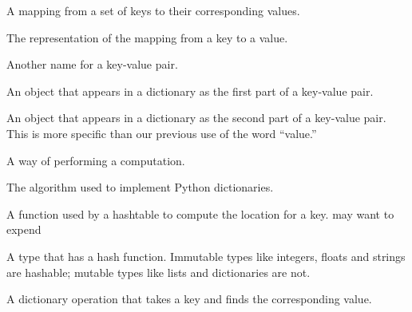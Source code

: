 \begin{vocabulary}[dictionary:] A mapping from a set of keys to their
corresponding values.
\end{vocabulary}
	
\begin{vocabulary} The representation of the mapping from
a key to a value.
\end{vocabulary}
	
\begin{vocabulary}[item:] Another name for a key-value pair.
\end{vocabulary}
	
\begin{vocabulary}[key:] An object that appears in a dictionary as the
first part of a key-value pair.
\end{vocabulary}
	
\begin{vocabulary}[value:] An object that appears in a dictionary as the
second part of a key-value pair.  This is more specific than
our previous use of the word ``value.''
\end{vocabulary}
	
\begin{vocabulary}[implementation:] A way of performing a computation.
\end{vocabulary}
	
\begin{vocabulary}[hashtable:] The algorithm used to implement Python
dictionaries.
\end{vocabulary}
	
\begin{vocabulary} A function used by a hashtable to compute the
location for a key.{\color{red} may want to expend}
\end{vocabulary}
	
\begin{vocabulary}[hashable:] A type that has a hash function.  Immutable
types like integers,
floats and strings are hashable; mutable types like lists and
dictionaries are not.
\end{vocabulary}
	
\begin{vocabulary}[lookup:] A dictionary operation that takes a key and finds
the corresponding value.
\end{vocabulary}
	
